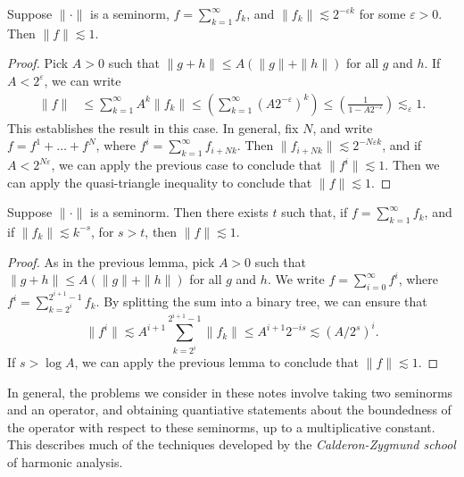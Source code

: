 \begin{lemma}
    Suppose $\| \cdot \|$ is a seminorm, $f = \sum_{k = 1}^\infty f_k$, and $\| f_k \| \lesssim 2^{-\varepsilon k}$ for some $\varepsilon > 0$. Then $\| f \| \lesssim 1$.
\end{lemma}
\begin{proof}
    Pick $A > 0$ such that $\| g + h \| \leq A(\| g \| + \| h \|)$ for all $g$ and $h$. If $A < 2^{\varepsilon}$, we can write
    \begin{align*}
        \| f \| &\leq \sum_{k = 1}^\infty A^k \| f_k \| \leq \left( \sum_{k = 1}^\infty (A 2^{-\varepsilon})^k \right) \leq \left( \frac{1}{1 - A 2^{-\varepsilon}} \right) \lesssim_\varepsilon 1.
    \end{align*}
    This establishes the result in this case. In general, fix $N$, and write $f = f^1 + \dots + f^N$, where $f^i = \sum_{k = 1}^\infty f_{i + Nk}$. Then $\| f_{i + Nk} \| \lesssim 2^{- N \varepsilon k}$, and if $A < 2^{N \varepsilon}$, we can apply the previous case to conclude that $\| f^i \| \lesssim 1$. Then we can apply the quasi-triangle inequality to conclude that $\| f \| \lesssim 1$.
\end{proof}

\begin{lemma}
    Suppose $\| \cdot \|$ is a seminorm. Then there exists $t$ such that, if $f = \sum_{k = 1}^\infty f_k$, and if $\| f_k \| \lesssim k^{-s}$, for $s > t$, then $\| f \| \lesssim 1$.
\end{lemma}
\begin{proof}
    As in the previous lemma, pick $A > 0$ such that $\| g + h \| \leq A(\| g \| + \| h \|)$ for all $g$ and $h$. We write $f = \sum_{i = 0}^\infty f^i$, where $f^i = \sum_{k = 2^i}^{2^{i+1} - 1} f_k$. By splitting the sum into a binary tree, we can ensure that
    \[ \| f^i \| \lesssim A^{i+1} \sum_{k = 2^i}^{2^{i+1} - 1} \| f_k \| \leq A^{i+1} 2^{- is} \lesssim (A/2^s)^i. \]
    If $s > \log A$, we can apply the previous lemma to conclude that $\| f \| \lesssim 1$.
\end{proof}

In general, the problems we consider in these notes involve taking two seminorms and an operator, and obtaining quantiative statements about the boundedness of the operator with respect to these seminorms, up to a multiplicative constant. This describes much of the techniques developed by the \emph{Calderon-Zygmund school} of harmonic analysis.






